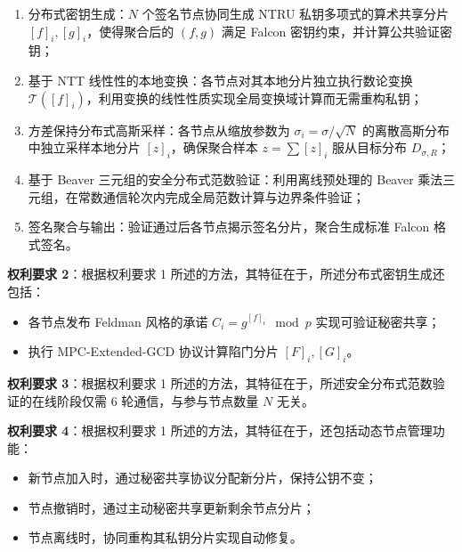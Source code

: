 \documentclass[12pt,a4paper]{article}
\begin{document}
\begin{enumerate}[label=(\alph*)]
    \item 分布式密钥生成：$N$ 个签名节点协同生成 NTRU 私钥多项式的算术共享分片 $[f]_i, [g]_i$，使得聚合后的 $(f, g)$ 满足 Falcon 密钥约束，并计算公共验证密钥；
    
    \item 基于 NTT 线性性的本地变换：各节点对其本地分片独立执行数论变换 $\mathcal{T}([f]_i)$，利用变换的线性性质实现全局变换域计算而无需重构私钥；
    
    \item 方差保持分布式高斯采样：各节点从缩放参数为 $\sigma_i = \sigma/\sqrt{N}$ 的离散高斯分布中独立采样本地分片 $[z]_i$，确保聚合样本 $z = \sum [z]_i$ 服从目标分布 $D_{\sigma, R}$；
    
    \item 基于 Beaver 三元组的安全分布式范数验证：利用离线预处理的 Beaver 乘法三元组，在常数通信轮次内完成全局范数计算与边界条件验证；
    
    \item 签名聚合与输出：验证通过后各节点揭示签名分片，聚合生成标准 Falcon 格式签名。
\end{enumerate}

\textbf{权利要求 2}：根据权利要求 1 所述的方法，其特征在于，所述分布式密钥生成还包括：
\begin{itemize}
    \item 各节点发布 Feldman 风格的承诺 $C_i = g^{[f]_i} \mod p$ 实现可验证秘密共享；
    \item 执行 MPC-Extended-GCD 协议计算陷门分片 $[F]_i, [G]_i$。
\end{itemize}

\textbf{权利要求 3}：根据权利要求 1 所述的方法，其特征在于，所述安全分布式范数验证的在线阶段仅需 6 轮通信，与参与节点数量 $N$ 无关。

\textbf{权利要求 4}：根据权利要求 1 所述的方法，其特征在于，还包括动态节点管理功能：
\begin{itemize}
    \item 新节点加入时，通过秘密共享协议分配新分片，保持公钥不变；
    \item 节点撤销时，通过主动秘密共享更新剩余节点分片；
    \item 节点离线时，协同重构其私钥分片实现自动修复。
\end{itemize}
\end{document}
